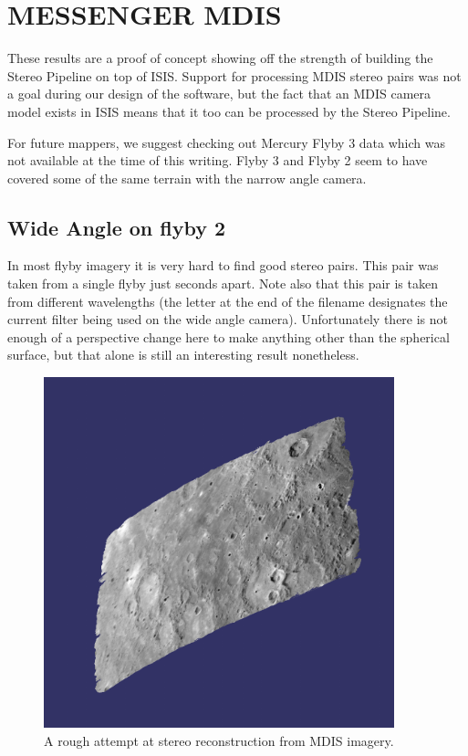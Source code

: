 \pagebreak

\section{MESSENGER MDIS}

These results are a proof of concept showing off the strength of
building the Stereo Pipeline on top of \ac{ISIS}. Support for processing
MDIS stereo pairs was not a goal during our design of the software,
but the fact that an MDIS camera model exists in ISIS means that
it too can be processed by the Stereo Pipeline.

For future mappers, we suggest checking out Mercury Flyby 3 data which
was not available at the time of this writing. Flyby 3 and Flyby 2
seem to have covered some of the same terrain with the narrow angle
camera.

\subsection{Wide Angle on flyby 2}

In most flyby imagery it is very hard to find good stereo pairs.
This pair was taken from a single flyby just seconds apart. Note
also that this pair is taken from different wavelengths (the letter
at the end of the filename designates the current filter being used
on the wide angle camera). Unfortunately there is not enough of a
perspective change here to make anything other than the spherical
surface, but that alone is still an interesting result nonetheless.

\begin{figure}[h!]
\begin{minipage}{4in}
\includegraphics[width=4in]{images/examples/mdis/mdis_wide_example.png}
\end{minipage}
\hfill
\begin{minipage}{2in}
  \caption{ A rough attempt at stereo reconstruction from MDIS imagery. }
  \label{fig:mdis_attempt}
\end{minipage}
\end{figure}

